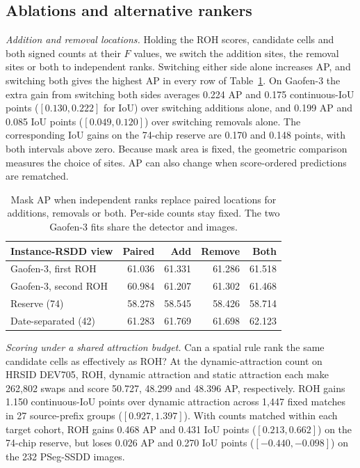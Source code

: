 \documentclass[journal]{IEEEtran}
\begin{document}
\subsection{Ablations and alternative rankers}
\label{sec:ablation}

\textit{Addition and removal locations.}
Holding the ROH scores, candidate cells and both signed counts at their \(F\) values, we switch the addition sites, the removal sites or both to independent ranks. Switching either side alone increases AP, and switching both gives the highest AP in every row of Table~\ref{tab:signed-side-ablation}. On Gaofen-3 the extra gain from switching both sides averages 0.224 AP and 0.175 continuous-IoU points (\([0.130,0.222]\) for IoU) over switching additions alone, and 0.199 AP and 0.085 IoU points (\([0.049,0.120]\)) over switching removals alone. The corresponding IoU gains on the 74-chip reserve are 0.170 and 0.148 points, with both intervals above zero. Because mask area is fixed, the geometric comparison measures the choice of sites. AP can also change when score-ordered predictions are rematched.

\begin{table}[t]
\centering
\caption{Mask AP when independent ranks replace paired locations for additions, removals or both. Per-side counts stay fixed. The two Gaofen-3 fits share the detector and images.}
\label{tab:signed-side-ablation}
\footnotesize
\setlength{\tabcolsep}{3.5pt}
\begin{tabular}{@{}lrrrr@{}}
\toprule
Instance-RSDD view & Paired & Add & Remove & Both\\
\midrule
Gaofen-3, first ROH & 61.036 & 61.331 & 61.286 & 61.518\\
Gaofen-3, second ROH & 60.984 & 61.207 & 61.302 & 61.468\\
Reserve (74) & 58.278 & 58.545 & 58.426 & 58.714\\
Date-separated (42) & 61.283 & 61.769 & 61.698 & 62.123\\
\bottomrule
\end{tabular}
\end{table}

\textit{Scoring under a shared attraction budget.}
Can a spatial rule rank the same candidate cells as effectively as ROH? At the dynamic-attraction count on HRSID DEV705, ROH, dynamic attraction and static attraction each make 262,802 swaps and score 50.727, 48.299 and 48.396 AP, respectively. ROH gains 1.150 continuous-IoU points over dynamic attraction across 1,447 fixed matches in 27 source-prefix groups (\([0.927,1.397]\)). With counts matched within each target cohort, ROH gains 0.468 AP and 0.431 IoU points (\([0.213,0.662]\)) on the 74-chip reserve, but loses 0.026 AP and 0.270 IoU points (\([-0.440,-0.098]\)) on the 232 PSeg-SSDD images.
\end{document}
